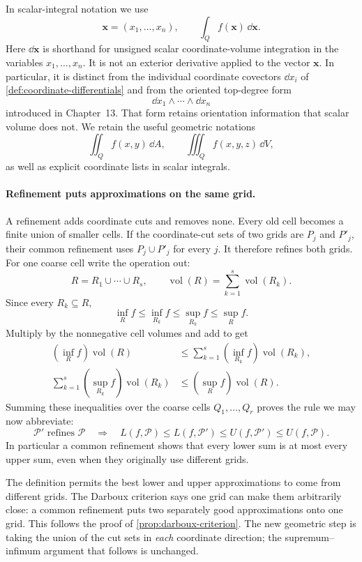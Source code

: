 In scalar-integral notation we use
\[
\mathbf{x}=(x_1,\ldots,x_n),\qquad
\int_Q f(\mathbf{x})\,\dd\mathbf{x}.
\]
Here $\dd\mathbf{x}$ is shorthand for unsigned scalar coordinate-volume
integration in the variables $x_1,\ldots,x_n$. It is not an exterior
derivative applied to the vector $\mathbf{x}$. In particular, it is distinct
from the individual coordinate covectors $\dd x_i$ of
\cref{def:coordinate-differentials} and from the oriented top-degree form
\[
\dd x_1\wedge\cdots\wedge\dd x_n
\]
introduced in Chapter~13. That form retains orientation information that
scalar volume does not. We retain the useful geometric notations
\[
\iint_Qf(x,y)\,\dd A,\qquad
\iiint_Qf(x,y,z)\,\dd V,
\]
as well as explicit coordinate lists in scalar integrals.

\paragraph{Refinement puts approximations on the same grid.}
A refinement adds coordinate cuts and removes none. Every old cell becomes
a finite union of smaller cells. If the coordinate-cut sets of two grids
are $P_j$ and $P'_j$, their common refinement uses $P_j\cup P'_j$ for
every $j$. It therefore refines both grids.
For one coarse cell write the operation out:
\[
R=R_1\cup\cdots\cup R_s,\qquad
\operatorname{vol}(R)=\sum_{k=1}^s\operatorname{vol}(R_k).
\]
Since every $R_k\subseteq R$,
\[
\inf_R f\leq\inf_{R_k}f\leq\sup_{R_k}f\leq\sup_R f.
\]
Multiply by the nonnegative cell volumes and add to get
\[
\begin{split}
(\inf_R f)\operatorname{vol}(R)&\leq
\sum_{k=1}^s(\inf_{R_k}f)\operatorname{vol}(R_k),\\
\sum_{k=1}^s(\sup_{R_k}f)\operatorname{vol}(R_k)&\leq
(\sup_R f)\operatorname{vol}(R).
\end{split}
\]
Summing these inequalities over the coarse cells $Q_1,\ldots,Q_r$ proves
the rule we may now abbreviate:
\[
\mathcal P'\text{ refines }\mathcal P\quad\Longrightarrow\quad
L(f,\mathcal P)\leq L(f,\mathcal P')\leq U(f,\mathcal P')\leq U(f,\mathcal P).
\]
In particular a common refinement shows that every lower sum is at most
every upper sum, even when they originally use different grids.

The definition permits the best lower and upper approximations to come from
different grids. The Darboux criterion says one grid can make them arbitrarily
close: a common refinement puts two separately good approximations onto one grid.
This follows the proof of \cref{prop:darboux-criterion}. The new geometric
step is taking the union of the cut sets in \emph{each} coordinate direction;
the supremum--infimum argument that follows is unchanged.



